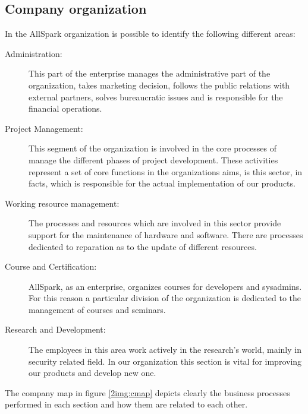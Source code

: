 \subsection{Company organization}
In the AllSpark organization is possible to identify the following
different areas:
\begin{description}
\item[Administration:] This part of the enterprise manages the
administrative part of the organization, takes marketing decision, follows
the public relations with external partners, solves bureaucratic issues
and is responsible for the financial operations.
\item[Project Management:] This segment of the organization is involved in
the core processes of manage the different phases of project development.
These activities represent a set of core functions in the organizations
aims, is this sector, in facts, which is responsible for the actual
implementation of our products.
\item[Working resource management:] The processes and resources which are
involved in this sector provide support for the maintenance of hardware
and software. There are processes dedicated to reparation as to the update
of different resources.
\item[Course and Certification:] AllSpark, as an enterprise, organizes
courses for developers and sysadmins. For this reason a particular division
of the organization is dedicated to the management of courses and seminars.
\item[Research and Development:] The employees in this area work actively in
the research's world, mainly in security related field. In our organization
this section is vital for improving our products and develop new one.
\end{description}
 
The company map in figure \ref{2img:cmap} depicts clearly the business processes
performed in each section and how them are related to each other.
 
